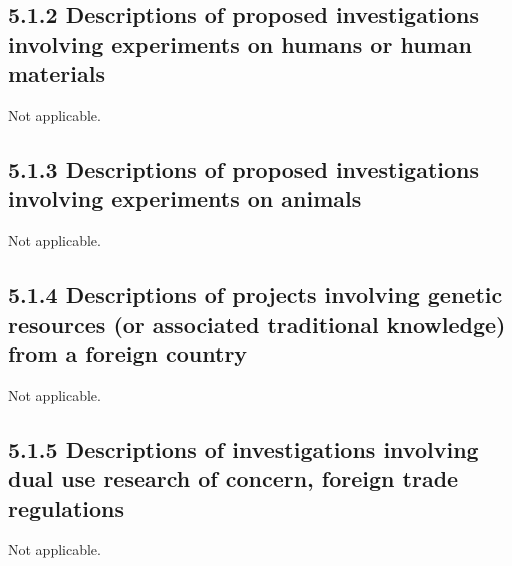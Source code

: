 \documentclass[11pt,a4paper]{article}
\theoremstyle{plain} \newtheorem{define}{Definition}[section]
\begin{document}
{%
\subsection*{5.1.2 Descriptions of proposed investigations involving experiments on humans or human materials}
%
\vspace{-0.4cm}
Not applicable.
\vspace{-0.4cm}


\subsection*{5.1.3 Descriptions of proposed investigations involving experiments on animals}
%
\vspace{-0.4cm}
Not applicable.
\vspace{-0.4cm}

\subsection*{5.1.4 Descriptions of projects involving genetic resources (or associated traditional knowledge) from a foreign country}
%
\vspace{-0.4cm}
Not applicable.
\vspace{-0.4cm}


\subsection*{5.1.5 Descriptions of investigations involving dual use research of concern, foreign trade regulations}
%
\vspace{-0.4cm}
Not applicable.
\vspace{-0.4cm}


}
\end{document}
